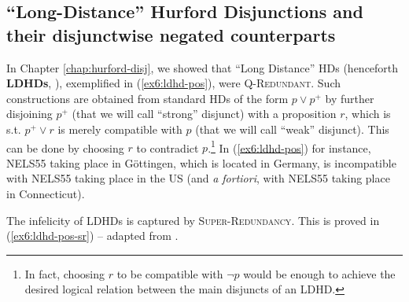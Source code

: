 \subsection{``Long-Distance'' Hurford Disjunctions and their disjunctwise negated counterparts}

In Chapter \ref{chap:hurford-disj}, we showed that ``Long Distance'' HDs (henceforth \textbf{LDHDs}, ), exemplified in (\ref{ex6:ldhd-pos}), were \textsc{Q-Redundant}. Such constructions are obtained from standard HDs of the form $p \vee p^+$ by further disjoining $p^+$ (that we will call ``strong'' disjunct) with a proposition $r$, which is s.t. $p^+ \vee r$ is merely compatible with $p$ (that we will call ``weak'' disjunct). This can be done by choosing $r$ to contradict $p$.\footnote{In fact, choosing $r$ to be compatible with $\neg p$ would be enough to achieve the desired logical relation between the main disjuncts of an LDHD.} In (\ref{ex6:ldhd-pos}) for instance, NELS55 taking place in Göttingen, which is located in Germany, is incompatible with NELS55 taking place in the US (and \textit{a fortiori}, with NELS55 taking place in Connecticut).

\begin{exe}
	\ex\label{ex6:ldhd-pos}
	\begin{xlist}
		\label{ex6:ldhd-pos-ws}
		\label{ex6:ldhd-pos-sw}
	\end{xlist}
\end{exe}

The infelicity of LDHDs is captured by \textsc{Super-Redundancy}. This is proved in (\ref{ex6:ldhd-pos-sr}) -- adapted from \textcite{Kalomoiros2024}.


